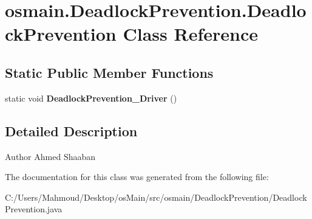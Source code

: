 \hypertarget{classosmain_1_1_deadlock_prevention_1_1_deadlock_prevention}{}\section{osmain.\+Deadlock\+Prevention.\+Deadlock\+Prevention Class Reference}
\label{classosmain_1_1_deadlock_prevention_1_1_deadlock_prevention}
\subsection*{Static Public Member Functions}
\begin{DoxyCompactItemize}
\item 
static void {\bfseries Deadlock\+Prevention\+\_\+\+Driver} ()\hypertarget{classosmain_1_1_deadlock_prevention_1_1_deadlock_prevention_a7746946a3060249ca9092aa023bee189}{}\label{classosmain_1_1_deadlock_prevention_1_1_deadlock_prevention_a7746946a3060249ca9092aa023bee189}

\end{DoxyCompactItemize}


\subsection{Detailed Description}
\begin{DoxyAuthor}{Author}
Ahmed Shaaban 
\end{DoxyAuthor}


The documentation for this class was generated from the following file\+:\begin{DoxyCompactItemize}
\item 
C\+:/\+Users/\+Mahmoud/\+Desktop/os\+Main/src/osmain/\+Deadlock\+Prevention/Deadlock\+Prevention.\+java\end{DoxyCompactItemize}
